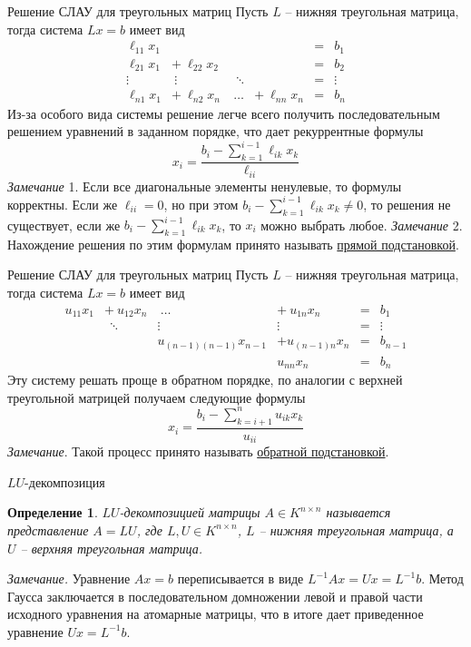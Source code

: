 \documentclass[10pt]{beamer}
\newcounter{def}
\newtheorem{definition_ru}{Определение}[def]
\begin{document}
\begin{frame}{Решение СЛАУ для треугольных матриц}
Пусть $L$ -- нижняя треугольная матрица, тогда система $Lx=b$ имеет вид
$$
\begin{array}{cccccc}
\ell_{11}x_1 & & & &=&b_1\\
\ell_{21}x_1 & +~\ell_{22}x_2 & & &=&b_2\\
\vdots & ~\vdots & ~~\ddots & &=&\vdots\\
\ell_{n1}x_1 & +~\ell_{n2}x_n &~\ldots &+~\ell_{nn}x_n &=&b_n
\end{array}
$$
\pause
Из-за особого вида системы решение легче всего получить последовательным решением уравнений в заданном порядке, что дает рекуррентные формулы
$$
x_i=\frac{b_i-\sum_{k=1}^{i-1}\ell_{ik}x_k}{\ell_{ii}}
$$
\pause
\textit{Замечание} 1. Если все диагональные элементы ненулевые, то формулы корректны. Если же $\ell_{ii}=0$, но при этом $b_i-\sum_{k=1}^{i-1}\ell_{ik}x_k\neq 0$, то решения не существует, если же $b_i-\sum_{k=1}^{i-1}\ell_{ik}x_k$, то $x_i$ можно выбрать любое.
\textit{Замечание} 2. Нахождение решения по этим формулам принято называть \underline{прямой подстановкой}.
\end{frame}

\begin{frame}{Решение СЛАУ для треугольных матриц}
Пусть $L$ -- нижняя треугольная матрица, тогда система $Lx=b$ имеет вид
$$
\begin{array}{cccccc}
u_{11}x_1 & +~u_{12}x_n &~\ldots &+~u_{1n}x_n &=&b_1\\
 & ~~\ddots & \vdots &\vdots &=&\vdots\\
  &  & u_{(n-1)(n-1)}x_{n-1}&+u_{(n-1)n}x_n&=&b_{n-1}\\
 & & & u_{nn}x_n&=&b_n
\end{array}
$$
\pause
Эту систему решать проще в обратном порядке, по аналогии с верхней треугольной матрицей получаем следующие формулы
$$
x_i=\frac{b_i-\sum_{k=i+1}^{n}u_{ik}x_k}{u_{ii}}
$$
\pause
\textit{Замечание}. Такой процесс принято называть \underline{обратной подстановкой}.
\end{frame}

\begin{frame}{$LU$-декомпозиция}
\begin{definition_ru}
$LU$-декомпозицией матрицы $A\in K^{n\times n}$ называется представление $A=LU$, где $L, U\in K^{n\times n}$, $L$ -- нижняя треугольная матрица, а $U$ -- верхняя треугольная матрица.
\end{definition_ru}
\pause
\textit{Замечание.} Уравнение $Ax=b$ переписывается в виде $L^{-1}Ax=Ux=L^{-1}b$. Метод Гаусса заключается в последовательном домножении левой и правой части исходного уравнения на атомарные матрицы, что в итоге дает приведенное уравнение $Ux=L^{-1}b$.
\end{frame}
\end{document}
